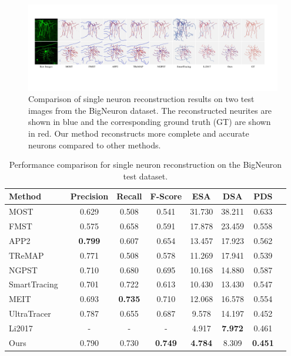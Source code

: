 \begin{figure}[th]
	\centering
	\includegraphics[width=1\textwidth]{./Illustrations/BigNeuron_comparison.pdf}
	\caption{Comparison of single neuron reconstruction results on two test images from the BigNeuron dataset.
	The reconstructed neurites are shown in blue and the corresponding ground truth (GT) are shown in red.
	Our method reconstructs more complete and accurate neurons compared to other methods.
	}
	\label{fig:compare_BigNeuron}
\end{figure}

\begin{table}[th]
	\centering
	\makeatletter{}\makeatother
	\caption{Performance comparison for single neuron reconstruction on the BigNeuron test dataset.}
	\label{table:compare_BigNeuron}
	\begin{tabular}{lccccccc}
		\toprule
		Method & Precision & Recall & F-Score & ESA & DSA & PDS\\
		\midrule
		MOST~\cite{Wu2014} & 0.629 & 0.508 & 0.541 & 31.730 & 38.211 & 0.633\\
		FMST~\cite{Yang2019} & 0.575 & 0.658 & 0.591 & 17.878 & 23.459 & 0.558\\
		APP2~\cite{Xiao2013} & \textbf{0.799} & 0.607 & 0.654 & 13.457 & 17.923 & 0.562\\
		TReMAP~\cite{Zhou2016} & 0.771 & 0.508 & 0.578 & 11.269 & 17.941 & 0.539\\
		NGPST~\cite{Quan2015} & 0.710 & 0.680 & 0.695 & 10.168 & 14.880 & 0.587\\
		SmartTracing~\cite{Chen2015} & 0.701 & 0.722 & 0.613 & 10.430 & 13.430 & 0.547\\
		MEIT~\cite{Wang2018} & 0.693  & \textbf{0.735} & 0.710 & 12.068 &16.578 & 0.554 \\
		UltraTracer~\cite{Peng2017} & 0.787 & 0.655 & 0.687 & 9.578 & 14.197 & 0.452 \\
		Li2017~\cite{Li2017} & - & - & - & 4.917 & \textbf{7.972} &0.461 \\
		\midrule
		Ours & 0.790 & 0.730 & \textbf{0.749} & \textbf{4.784} & 8.309 & \textbf{0.451}\\
		\bottomrule
	\end{tabular}
\end{table}

